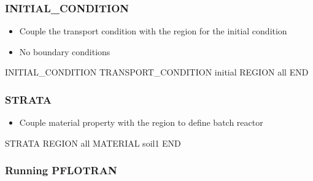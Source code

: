\documentclass{beamer}
\begin{document}
\begin{frame}[fragile]\frametitle{INITIAL\_CONDITION}

\begin{itemize}
\item Couple the transport condition with the region for the initial condition
\item No boundary conditions
\end{itemize}

\begin{semiverbatim}

INITIAL_CONDITION
  TRANSPORT_CONDITION initial
  REGION all
END

\end{semiverbatim}

\end{frame}

\begin{frame}[fragile]\frametitle{STRATA}

\begin{itemize}
\item Couple material property with the region to define batch reactor
\end{itemize}

\begin{semiverbatim}

STRATA
  REGION all
  MATERIAL soil1
END


\end{semiverbatim}

\end{frame}

\begin{frame}[fragile]\frametitle{Running PFLOTRAN}


\end{frame}
\end{document}
